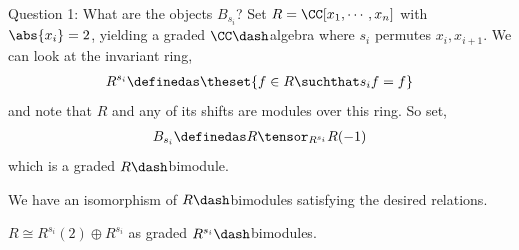 Question 1: What are the objects \(B_{s_i}\)? Set
\(R = \CC[x_1, \cdots, x_n]\) with \(\abs{x_i} = 2\), yielding a graded
\(\CC\dash\)algebra where \(s_i\) permutes \(x_i, x_{i+1}\). We can look
at the invariant ring,
\begin{align*}
R^{s_i} \definedas \theset{f\in R \suchthat s_i f = f}
\end{align*} and note that \(R\) and any of its shifts are modules over
this ring. So set,
\begin{align*}
B_{s_i} \definedas R \tensor_{R^{s_i}} R(-1)
\end{align*} which is a graded \(R\dash\)bimodule.

\begin{proposition}[?]

We have an isomorphism of \(R\dash\)bimodules satisfying the desired
relations.

\end{proposition}

\begin{claim}

\(R\cong R^{s_i}(2) \oplus R^{s_i}\) as graded
\(R^{s_i}\dash\)bimodules.

\end{claim}

